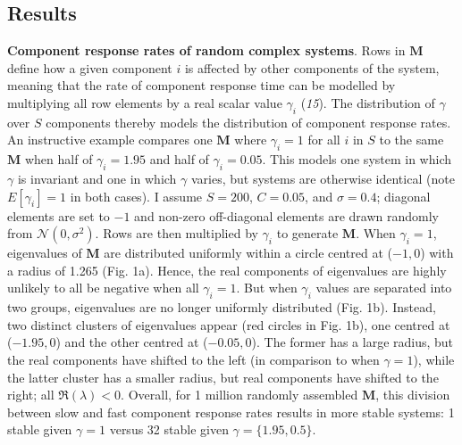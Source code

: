 \documentclass[]{article}
\begin{document}
\subsection{Results}\label{results}

\textbf{Component response rates of random complex systems}. Rows in
\(\mathbf{M}\) define how a given component \(i\) is affected by other
components of the system, meaning that the rate of component response
time can be modelled by multiplying all row elements by a real scalar
value \(\gamma_{i}\) (\emph{15}). The distribution of \(\gamma\) over
\(S\) components thereby models the distribution of component response
rates. An instructive example compares one \(\mathbf{M}\) where
\(\gamma_{i} = 1\) for all \(i\) in \(S\) to the same \(\mathbf{M}\)
when half of \(\gamma_{i} = 1.95\) and half of \(\gamma_{i} = 0.05\).
This models one system in which \(\gamma\) is invariant and one in which
\(\gamma\) varies, but systems are otherwise identical (note
\(E[\gamma_{i}] = 1\) in both cases). I assume \(S = 200\),
\(C = 0.05\), and \(\sigma = 0.4\); diagonal elements are set to \(-1\)
and non-zero off-diagonal elements are drawn randomly from
\(\mathcal{N}(0, \sigma^{2})\). Rows are then multiplied by
\(\gamma_{i}\) to generate \(\mathbf{M}\). When \(\gamma_{i} = 1\),
eigenvalues of \(\mathbf{M}\) are distributed uniformly within a circle
centred at (\(-1, 0\)) with a radius of 1.265 (Fig. 1a). Hence, the real
components of eigenvalues are highly unlikely to all be negative when
all \(\gamma_{i} = 1\). But when \(\gamma_{i}\) values are separated
into two groups, eigenvalues are no longer uniformly distributed (Fig.
1b). Instead, two distinct clusters of eigenvalues appear (red circles
in Fig. 1b), one centred at (\(-1.95, 0\)) and the other centred at
(\(-0.05, 0\)). The former has a large radius, but the real components
have shifted to the left (in comparison to when \(\gamma = 1\)), while
the latter cluster has a smaller radius, but real components have
shifted to the right; all \(\Re({\lambda}) < 0\). Overall, for 1 million
randomly assembled \(\mathbf{M}\), this division between slow and fast
component response rates results in more stable systems: 1 stable given
\(\gamma = 1\) versus 32 stable given \(\gamma = \{1.95, 0.5\}\).
\end{document}
